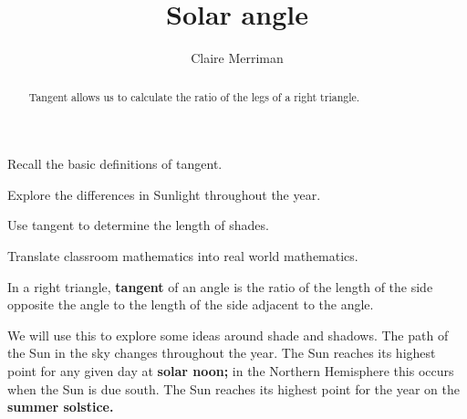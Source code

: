 \documentclass[noauthor,nooutcomes,handout,hints]{ximera}
\title{Solar angle} \author{Claire Merriman}
\begin{document}
\begin{abstract}
Tangent allows us to calculate the ratio of the legs of a right triangle.
\end{abstract}
\maketitle

\begin{listOutcomes}
\item  Recall the basic definitions of tangent.
\item Explore the differences in Sunlight throughout the year.
\item Use tangent to determine the length of shades.
\item Translate classroom mathematics into real world mathematics.
\end{listOutcomes}


\mynewpage


\begin{definition}
 In a right triangle, \textbf{tangent} of an angle is the ratio of the length of the side opposite the angle to the length of the side adjacent to the angle. 
\end{definition}
We will use this to explore some ideas around shade and shadows.  The
path of the Sun in the sky changes throughout the year. The Sun
reaches its highest point for any given day at \textbf{solar noon;} in
the Northern Hemisphere this occurs when the Sun is due south. The Sun
reaches its highest point for the year on the \textbf{summer solstice.}

\begin{center}
 
\end{center}
\end{document}
